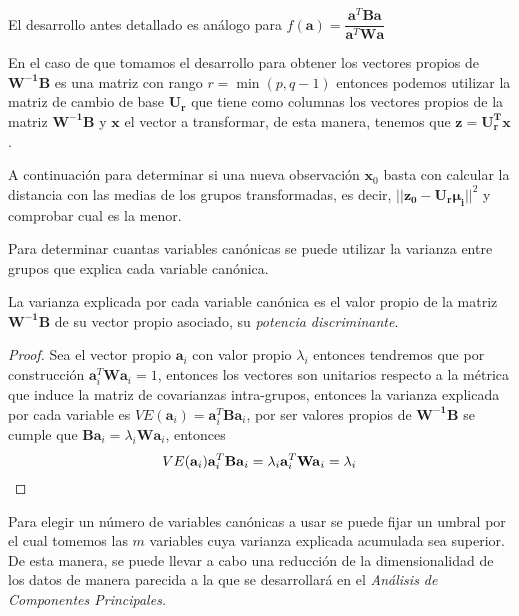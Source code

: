 \begin{propo}
El desarrollo antes detallado es análogo para $f(\textbf{a})=\dfrac{\textbf{a}^T \textbf{B}\textbf{a}}{\textbf{a}^T \textbf{W}\textbf{a}}$
\end{propo}

\noindent En el caso de que tomamos el desarrollo para obtener los vectores propios de $\mathbf{W^{-1}B}$ es una matriz con rango $r=\min(p,q-1)$ entonces podemos utilizar la matriz de cambio de base $\mathbf{U_r}$ que tiene como columnas los vectores propios de la matriz $\mathbf{W^{-1}B}$ y $\mathbf{x}$ el vector a transformar, de esta manera, tenemos que $\mathbf{z=U_r^T x}$.

\noindent A continuación para determinar si una nueva observación $\mathbf{x}_0$ basta con calcular la distancia con las medias de los grupos transformadas, es decir, $||\mathbf{z_0-U_r\mu_i}||^2$ y comprobar cual es la menor. 

\noindent Para determinar cuantas variables canónicas se puede utilizar la varianza entre grupos que explica cada variable canónica. 

\begin{propo}
La varianza explicada por cada variable canónica es el valor propio de la matriz $\mathbf{W^{-1} B}$ de su vector propio asociado, su \emph{potencia discriminante}. 
\begin{proof}
Sea el vector propio $\textbf{a}_i$ con valor propio $\lambda_i$ entonces tendremos que por construcción $\mathbf{a}_i^T \mathbf{W a}_i=1$, entonces los vectores son unitarios respecto a la métrica que induce la matriz de covarianzas intra-grupos, entonces la varianza explicada por cada variable es $VE(\textbf{a}_i)=\mathbf{a}_i^T\mathbf{Ba}_i$, por ser valores propios de $\mathbf{W^{-1}B}$ se cumple que $\mathbf{Ba}_i=\lambda_i \mathbf{W a}_i$, entonces
\begin{equation}
VE(\textbf{a}_i)\mathbf{a}_i^T\mathbf{Ba}_i=\lambda_i \mathbf{a}_i^T\mathbf{Wa}_i=\lambda_i\qedhere
\end{equation}
\end{proof}
\end{propo}

\noindent Para elegir un número de variables canónicas a usar se puede fijar un umbral por el cual tomemos las $m$ variables cuya varianza explicada acumulada sea superior. De esta manera, se puede llevar a cabo una reducción de la dimensionalidad de los datos de manera parecida a la que se desarrollará en el \emph{Análisis de Componentes Principales.}